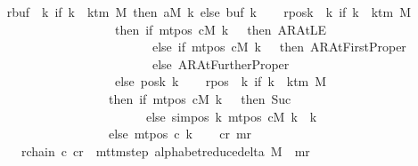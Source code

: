 \begin{isabellebody}
\ \ \isamarkupfalse%
\ {\isacharquery}{\kern0pt}rbuf\ {\isacharequal}{\kern0pt}\ {\isachardoublequoteopen}{\isasymlambda}k{\isachardot}{\kern0pt}\ if\ k\ {\isacharless}{\kern0pt}\ k{\isacharunderscore}{\kern0pt}tm\ M\ then\ {\isacharquery}{\kern0pt}aM\ k\ else\ buf{}\ k{\isachardoublequoteclose}\isanewline
\ \ \isamarkupfalse%
\ {\isacharquery}{\kern0pt}rposk\ {\isacharequal}{\kern0pt}\ {\isachardoublequoteopen}{\isasymlambda}k{\isachardot}{\kern0pt}\ if\ k\ {\isacharless}{\kern0pt}\ k{\isacharunderscore}{\kern0pt}tm\ M\isanewline
\ \ \ \ \ \ \ \ \ \ \ \ \ \ \ \ \ \ \ \ \ then\ {\isacharparenleft}{\kern0pt}if\ mt{\isacharunderscore}{\kern0pt}pos\ cM\ k\ {\isacharequal}{\kern0pt}\ {}\ then\ AR{\isacharunderscore}{\kern0pt}AtLE\isanewline
\ \ \ \ \ \ \ \ \ \ \ \ \ \ \ \ \ \ \ \ \ \ \ \ \ \ \ else\ if\ mt{\isacharunderscore}{\kern0pt}pos\ cM\ k\ {\isacharequal}{\kern0pt}\ {}\ then\ AR{\isacharunderscore}{\kern0pt}AtFirstProper\isanewline
\ \ \ \ \ \ \ \ \ \ \ \ \ \ \ \ \ \ \ \ \ \ \ \ \ \ \ else\ AR{\isacharunderscore}{\kern0pt}AtFurtherProper{\isacharparenright}{\kern0pt}\isanewline
\ \ \ \ \ \ \ \ \ \ \ \ \ \ \ \ \ \ \ \ \ else\ posk{}\ k{\isachardoublequoteclose}\isanewline
\ \ \isamarkupfalse%
\ {\isacharquery}{\kern0pt}rpos\ {\isacharequal}{\kern0pt}\ {\isachardoublequoteopen}{\isasymlambda}k{\isachardot}{\kern0pt}\ if\ k\ {\isacharless}{\kern0pt}\ k{\isacharunderscore}{\kern0pt}tm\ M\isanewline
\ \ \ \ \ \ \ \ \ \ \ \ \ \ \ \ \ \ \ \ then\ {\isacharparenleft}{\kern0pt}if\ mt{\isacharunderscore}{\kern0pt}pos\ cM\ k\ {\isacharequal}{\kern0pt}\ {}\ then\ Suc\ {}\isanewline
\ \ \ \ \ \ \ \ \ \ \ \ \ \ \ \ \ \ \ \ \ \ \ \ \ \ else\ sim{\isacharunderscore}{\kern0pt}pos\ {\isacharquery}{\kern0pt}k\ {\isacharparenleft}{\kern0pt}mt{\isacharunderscore}{\kern0pt}pos\ cM\ k{\isacharparenright}{\kern0pt}\ {\isacharplus}{\kern0pt}\ {\isacharquery}{\kern0pt}k{\isacharparenright}{\kern0pt}\isanewline
\ \ \ \ \ \ \ \ \ \ \ \ \ \ \ \ \ \ \ \ else\ mt{\isacharunderscore}{\kern0pt}pos\ c{\isacharprime}{\kern0pt}\ k{\isachardoublequoteclose}\isanewline
\ \ \isamarkupfalse%
\ c{\isacharunderscore}{\kern0pt}r\ m{\isacharunderscore}{\kern0pt}r\ \isanewline
\ \ \ \ \ \ r{\isacharunderscore}{\kern0pt}chain{\isacharcolon}{\kern0pt}\ {\isachardoublequoteopen}{\isacharparenleft}{\kern0pt}c{\isacharprime}{\kern0pt}{\isacharcomma}{\kern0pt}\ c{\isacharunderscore}{\kern0pt}r{\isacharparenright}{\kern0pt}\ {\isasymin}\ {\isacharparenleft}{\kern0pt}mttm{\isacharunderscore}{\kern0pt}step\ {\isacharparenleft}{\kern0pt}alphabet{\isacharunderscore}{\kern0pt}reduce{\isacharunderscore}{\kern0pt}delta\ M{\isacharparenright}{\kern0pt}{\isacharparenright}{\kern0pt}\ {\isacharcircum}{\kern0pt}{\isacharcircum}{\kern0pt}\ m{\isacharunderscore}{\kern0pt}r{\isachardoublequoteclose}\isanewline

\end{isabellebody}
